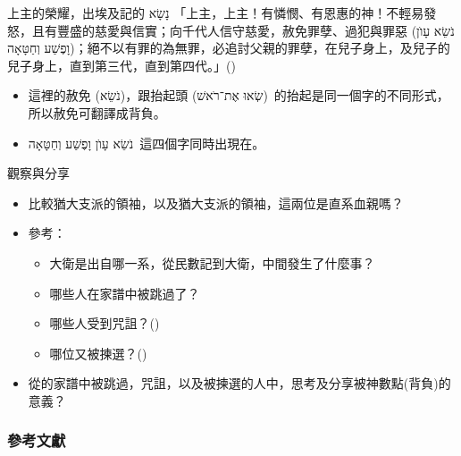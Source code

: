 \documentclass{beamer}
\begin{document}
\begin{frame}{上主的榮耀，出埃及記的 \texthebrew{נָשָׂא}\parencite{nasa}}
  「上主，上主！有憐憫、有恩惠的神！不輕易發怒，且有豐盛的慈愛與信實；向千代人信守慈愛，赦免罪孽、過犯與罪惡 (\texthebrew{נֹשֵׂא עָוֺן וָפֶשַׁע וְחַטָּאָה})；絕不以有罪的為無罪，必追討父親的罪孽，在兒子身上，及兒子的兒子身上，直到第三代，直到第四代。」()

  \begin{itemize}
    \item 這裡的赦免 (\texthebrew{נֹשֵׂא})，跟抬起頭 (\texthebrew{שְׂאוּ אֶת־רֹאשׁ})\ 的抬起是同一個字的不同形式，所以赦免可翻譯成背負。
    \item \texthebrew{נֹשֵׂא עָוֺן וָפֶשַׁע וְחַטָּאָה}\ 這四個字同時出現在。
  \end{itemize}
\end{frame}

\begin{frame}{觀察與分享}
  \begin{itemize}
    \item 比較猶大支派的領袖，以及猶大支派的領袖，這兩位是直系血親嗎？
    \item 參考：
      \begin{itemize}
        \item 大衛是出自哪一系，從民數記到大衛，中間發生了什麼事？
        \item 哪些人在家譜中被跳過了？
        \item 哪些人受到咒詛？()
        \item 哪位又被揀選？()
      \end{itemize}
    \item 從的家譜中被跳過，咒詛，以及被揀選的人中，思考及分享被神數點(背負)的意義？
  \end{itemize}
\end{frame}

\begin{frame}[allowframebreaks]
  \frametitle{參考文獻}
  \printbibliography
\end{frame}
\end{document}
